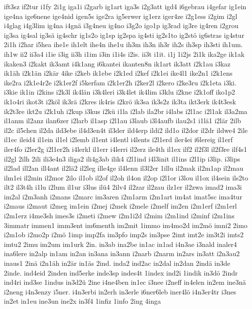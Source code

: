 {ift3sz
if2tur
i1fy
2i1g
iga1i
i2garb
ig1art
iga3s
i2g3att
igd4
i6gebrau
i4gefar
ig1ein
ige4na
ige6nene
ige4nid
igen5s
ige2ra
ig5erwer
ig1erz
iger4ze
i2g1ess
i2gim
i2gl
i4glag
i4g3lim
ig4na
i4gnä
i3g4neu
ig4no
i3g2o
igo1p
ig3rad
ig3re
ig4ren
i2grou
ig3sa
ig4sal
ig3sä
ig4schr
ig1s2o
ig1sp
ig2spa
ig4sti
ig2s1to
ig2stö
ig6stras
ig4stur
2i1h
i2har
i5hea
ihe1e
ih1elt
ihe4n
ihe1u
ih3m
ih3n
ih3r
ih2s
ih3sp
ih3sti
ih1um.
ih1w
ii2
ii3a4
i1ie
i3ig
ii3h
i1im
i3in
i1i4s
i2is.
ii3t
i1it.
i1j
1i2js
2i1k
ika2ge
ik1ak
ikaken3
i2kakt
ik3amt
i4k1ang
i6kantei
ikanten8n
ik1art
ik3att
i2k1au
i3kaz
ik1äh
i2k1än
i2kär
4ike
i2keb
ik1ebe
i2k1ed
i2kef
i2k1ei
ike4l1
ike2n1
i2k1ens
ike2ra
i2k1e4r2e
i2k1er2f
i5kerfam
i2k1er2h
i2ker2l
i2kero
i2ke3ru
i2k1eta
i3ki.
i3kie
ik1in
i2kins
i2k3l
ik4län
i3k4leri
i3k4let
ik4lim
i3klu
i2kne
i2k1off
iko1p2
ik1o4ri
ikot3t
i2köl
ik3rä
i2kres
ik4ris
i2krö
ik3sa
ik3s2z
ik3ta
ikt3erk
ik4t3esk
ik2t3re
ikt2u
i2k1uh
i2kup
i3kus
i2kü
i1la
i2lab
ila2br
i4labs
i2l1ac
i2l1ak
il3a2ma
il1anm
il2anz
ilan6zer
i2larb
il1asp
i2l1au
i3laub
i3l4aufb
ilau2s1
i1lä1
i2lär
2ilb
il2c
il5chen
il2da
ild3ebe
il4d3en4t
il3der
ild4erp
ildi2
ild1o
il2dor
il2dr
ildwe4
2ile
il1ec
ileid4
il1ein
il1el
i2lemb
il1ent
i4lentl
i4lents
i2l1erd
iler4ei
i6lereig
il1erf
iler4fo
i2ler2g
i2l1er2h
i4lerkl
il1err
i4lerri
il2erz
ile4th
il1ex
ilf2
il2f3l
il2f3re
ilf4s1
il2gl
2ilh
2ili
ili3e4n3
iliga2
ili4g3ab
ilik4
i2l1ind
i4l3init
il1ins
i2l1ip
i3lip.
i3lips
il2lad
ill2an
ill4ant
il2lä2
il2leg
ille4ge
il4lenn
il3l2er
1illu
il2mak
il2m1ap
il2mau
ilm1ei
il2min
il2mor
2ilo
il1ob
il2of
il2oh
il4on
il2op
i2l1or
i3lou
il1ox
il4sein
ils2to
ilt2
il3t4h
i1lu
i2lum
il1ur
i3lus
ilü4
2ilv4
il2zar
il2zau
ilz1er
il2zwa
imad2
ima3i
im2al
i2m3anh
i2mans
i2marc
im3aren
i2m1arm
i2m1art
im4at
imat5sc
ima4tur
i2maus
i2maut
i2meg
im1ein
i2mej
i2mek
i2mele
i2melf
im2en
i2m1erf
i2m1erl
i2m1erz
i4me3sh
imes3s
i2meti
i2mew
i2m1i2d
i2mim
i2m1ind
i2minf
i2m1ins
3immatr
immen1
imm3ent
im6menth
im2mit
1immo
im4mo2d
im2mö
imni2
2imo
i2m1ob
i2mo2p
i2mö
1imp
imp2fa
im3pfo
imp2s
im3pse
2imt
imt2e
im3t2i
imts2
imtu2
2imu
im2um
im1urk
2in.
in3ab
ina2be
in1ac
in1ad
i4n3ae
i3nald
inaler4
ina6lere
in2alp
in1am
in2an
in3ana
in3ann
i2narb
i2narm
in2ars
in3att
i2n3au2
inaus1
2inä
i2n1äh
in2är
in1äs
2ind.
inda2
ind2ac
in2dal
in2dan
2indä
in3de
2inde.
ind4eid
2inden
ind5erke
inde3sp
indes4t
1index
ind2i
1indik
in3dö
2indr
ind4ri
ind3se
1indus
in3d2ü
2ine
i4ne4ben
in1ec
i3nee
i2neff
in4elen
in2em
ine3nä
i2neng
i4n3enzy
i5ner.
i4n3erbi
in2erh
in3erle
i6ner6leb
iner4lö
i4n3er4tr
i3nes
in2et
in1eu
ine3un
ine2x
in3f4
1infiz
1info
2ing
4inga
}

